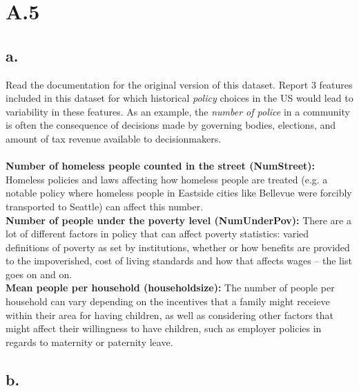 \documentclass{article}
\newcommand{\1}{\mathbf{1}}
\begin{document}
\section*{A.5}
{\Large 

\subsection*{a.}

Read the documentation for the original
  version of this dataset. Report 3 features included in this dataset for which historical \emph{policy} choices in the US would lead to variability in these features. As an example, the \emph{number of police} in a community
  is often the consequence of decisions made by governing bodies, elections, and amount of tax revenue available to decisionmakers. \\ \\
\textbf{Number of homeless people counted in the street (NumStreet):} Homeless policies and laws affecting how homeless people are treated (e.g. a notable policy where homeless people in Eastside cities like Bellevue were forcibly transported to Seattle) can affect this number. \\
\textbf{Number of people under the poverty level (NumUnderPov):} There are a lot of different factors in policy that can affect poverty statistics: varied definitions of poverty as set by institutions, whether or how benefits are provided to the impoverished, cost of living standards and how that affects wages -- the list goes on and on. \\
\textbf{Mean people per household (householdsize):} The number of people per household can vary depending on the incentives that a family might receieve within their area for having children, as well as considering other factors that might affect their willingness to have children, such as employer policies in regards to maternity or paternity leave. \\

\subsection*{b.}

}
\end{document}

